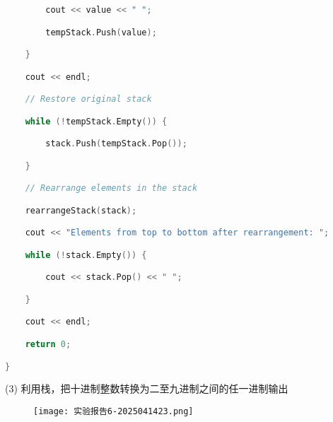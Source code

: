 \begin{lstlisting}[language=C++]
        cout << value << " ";

        tempStack.Push(value);

    }

    cout << endl;

    // Restore original stack

    while (!tempStack.Empty()) {

        stack.Push(tempStack.Pop());

    }

    // Rearrange elements in the stack

    rearrangeStack(stack);

    cout << "Elements from top to bottom after rearrangement: ";

    while (!stack.Empty()) {

        cout << stack.Pop() << " ";

    }

    cout << endl;

    return 0;

}
\end{lstlisting}
(3)
利用栈，把十进制整数转换为二至九进制之间的任一进制输出
\begin{figure}[H]
\centering
\texttt{[image: 实验报告6-2025041423.png]}
\label{}
\end{figure}

